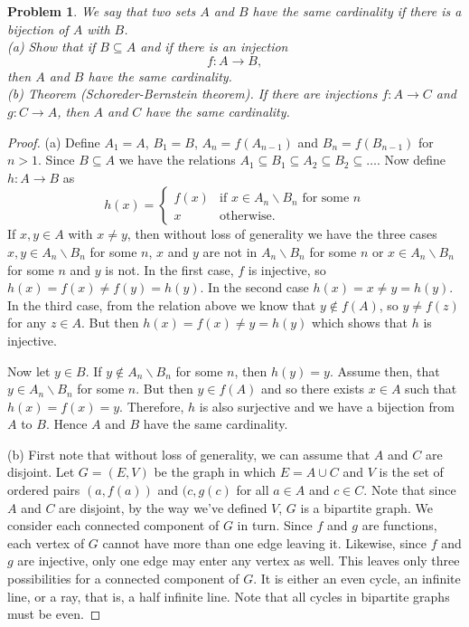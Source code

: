 \documentclass{article}
\newtheorem{problem}{Problem}
\begin{document}
\begin{problem}
We say that two sets $A$ and $B$ \emph{have the same cardinality} if there is a bijection of $A$ with $B$.\\
(a) Show that if $B \subseteq A$ and if there is an injection
\[
f : A \to B,
\]
then $A$ and $B$ have the same cardinality.\\
(b) Theorem (Schoreder-Bernstein theorem). If there are injections $f: A \to C$ and $g : C \to A$, then $A$ and $C$ have the same cardinality.
\end{problem}
\begin{proof}
(a) Define $A_1 = A$, $B_1 = B$, $A_n = f(A_{n-1})$ and $B_n = f(B_{n-1})$ for $n > 1$. Since $B \subseteq A$ we have the relations $A_1 \subseteq B_1 \subseteq A_2 \subseteq B_2 \subseteq \dots$. Now define $h : A \to B$ as
\[
h(x) =
\begin{cases}
f(x) & \text{if $x \in A_n \backslash B_n$ for some $n$}\\
x & \text{otherwise}.
\end{cases}
\]
If $x, y \in A$ with $x \neq y$, then without loss of generality we have the three cases $x,y \in A_n \backslash B_n$ for some $n$, $x$ and $y$ are not in $A_n \backslash B_n$ for some $n$ or $x \in A_n \backslash B_n$ for some $n$ and $y$ is not. In the first case, $f$ is injective, so $h(x) = f(x) \neq f(y) = h(y)$. In the second case $h(x) = x \neq y = h(y)$. In the third case, from the relation above we know that $y \notin f(A)$, so $y \neq f(z)$ for any $z \in A$. But then $h(x) = f(x) \neq y = h(y)$ which shows that $h$ is injective.

Now let $y \in B$. If $y \notin A_n \backslash B_n$ for some $n$, then $h(y) = y$. Assume then, that $y \in A_n \backslash B_n$ for some $n$. But then $y \in f(A)$ and so there exists $x \in A$ such that $h(x) = f(x) = y$. Therefore, $h$ is also surjective and we have a bijection from $A$ to $B$. Hence $A$ and $B$ have the same cardinality.

(b) First note that without loss of generality, we can assume that $A$ and $C$ are disjoint. Let $G = (E, V)$ be the graph in which $E = A \cup C$ and $V$ is the set of ordered pairs $(a, f(a))$ and $(c, g(c)$ for all $a \in A$ and $c \in C$. Note that since $A$ and $C$ are disjoint, by the way we've defined $V$, $G$ is a bipartite graph. We consider each connected component of $G$ in turn. Since $f$ and $g$ are functions, each vertex of $G$ cannot have more than one edge leaving it. Likewise, since $f$ and $g$ are injective, only one edge may enter any vertex as well. This leaves only three possibilities for a connected component of $G$. It is either an even cycle, an infinite line, or a ray, that is, a half infinite line. Note that all cycles in bipartite graphs must be even.


\end{proof}
\end{document}
